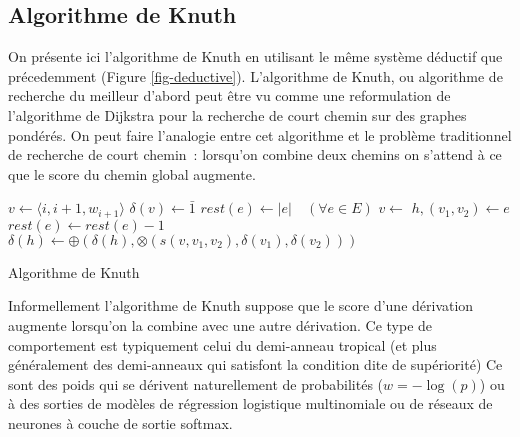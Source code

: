 \documentclass[11pt,openany]{book}
\begin{document}
\subsection{Algorithme de Knuth}

On présente ici l'algorithme de Knuth en utilisant le même système déductif que précedemment (Figure \ref{fig-deductive}).
L'algorithme de Knuth, ou algorithme de recherche du meilleur d'abord peut être vu comme
 une reformulation de l'algorithme de Dijkstra pour la recherche de court chemin sur des graphes pondérés.
On peut faire l'analogie entre cet algorithme et le problème traditionnel de recherche de court chemin~:
lorsqu'on combine deux chemins on s'attend à ce que le score du chemin global augmente.


\begin{algorithm}[htbp]
\begin{algorithmic}
\State $v \gets \langle i,i+1,w_{i+1} \rangle$
\State $\delta(v) \gets \bar{1}$
\State  {}
\EndFor
\State   $rest(e) \gets |e| \quad (\forall e \in E)$ 
\State $v \gets $ 
\State $h, (v_1, v_2) \gets e$
\State $rest(e) \gets rest(e) - 1$
\State $\delta(h) \gets \oplus( \delta(h),  \otimes(s(v,v_1,v_2),\delta(v_1),\delta(v_2)))$
\State {}
\EndIf
\EndFor
\EndWhile
\EndFunction
\end{algorithmic}
\caption{\label{algo-knuth} Algorithme de Knuth}
\end{algorithm}


Informellement l'algorithme de Knuth suppose que le score d'une dérivation augmente lorsqu'on la combine avec une autre dérivation.
Ce type de comportement est typiquement celui du demi-anneau tropical (et plus généralement des demi-anneaux qui satisfont 
la condition dite de supériorité)
Ce sont des poids qui se dérivent naturellement de probabilités 
($w = -\log(p)$) ou à des sorties de modèles de régression logistique multinomiale ou de réseaux de neurones
à couche de sortie softmax.
\end{document}

